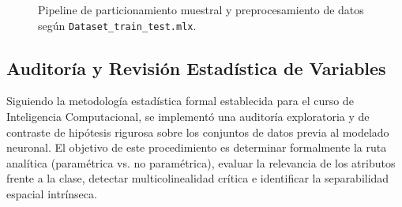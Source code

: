 \documentclass{article}
\begin{document}
\begin{figure}[H]
\centering
{}
\caption{Pipeline de particionamiento muestral y preprocesamiento de datos según \texttt{Dataset\_train\_test.mlx}.}
\label{fig:tikz_pipeline}
\end{figure}

\subsection{Auditoría y Revisión Estadística de Variables}
Siguiendo la metodología estadística formal establecida para el curso de Inteligencia Computacional, se implementó una auditoría exploratoria y de contraste de hipótesis rigurosa sobre los conjuntos de datos previa al modelado neuronal. El objetivo de este procedimiento es determinar formalmente la ruta analítica (paramétrica vs. no paramétrica), evaluar la relevancia de los atributos frente a la clase, detectar multicolinealidad crítica e identificar la separabilidad espacial intrínseca.
\end{document}
